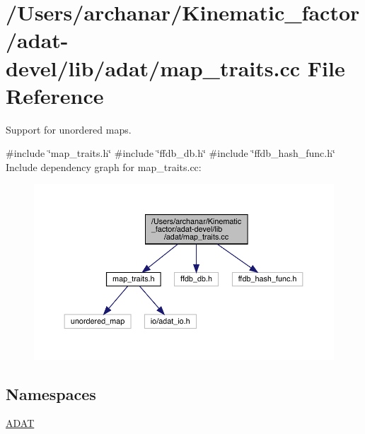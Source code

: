 \hypertarget{adat-devel_2lib_2adat_2map__traits_8cc}{}\section{/\+Users/archanar/\+Kinematic\+\_\+factor/adat-\/devel/lib/adat/map\+\_\+traits.cc File Reference}
\label{adat-devel_2lib_2adat_2map__traits_8cc}


Support for unordered maps.  


{\ttfamily \#include \char`\"{}map\+\_\+traits.\+h\char`\"{}}\newline
{\ttfamily \#include \char`\"{}ffdb\+\_\+db.\+h\char`\"{}}\newline
{\ttfamily \#include \char`\"{}ffdb\+\_\+hash\+\_\+func.\+h\char`\"{}}\newline
Include dependency graph for map\+\_\+traits.\+cc\+:
\nopagebreak
\begin{figure}[H]
\begin{center}
\leavevmode
\includegraphics[width=350pt]{d8/d29/adat-devel_2lib_2adat_2map__traits_8cc__incl}
\end{center}
\end{figure}
\subsection*{Namespaces}
\begin{DoxyCompactItemize}
\item 
 \mbox{\hyperlink{namespaceADAT}{A\+D\+AT}}
\end{DoxyCompactItemize}
